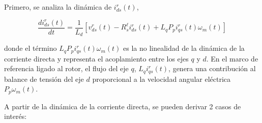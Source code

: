 \documentclass[blue,fullpaper]{ludusofficial}  %
\begin{document}
Primero, se analiza la dinámica de $i_{ds}^{r}(t)$,

\begin{equation}
\label{variacion_ids}
    \frac{di_{ds}^{r}(t)}{dt} = \frac{1}{L_{d}} \left[ v_{ds}^{r}(t) - R_{s}^{\ell} i_{ds}^{r}(t) + L_{q}P_{p} i_{qs}^{r}(t) \omega_{m}(t) \right]
\end{equation}

donde el término $L_q P_p i_{qs}^{r}(t)\omega_m(t)$ es la no linealidad de la dinámica de la corriente directa y representa el
acoplamiento entre los ejes $q$ y $d$. En el marco de referencia
ligado al rotor, el flujo del eje $q$, $L_q i_{qs}^{r}(t)$, genera
una contribución al balance de tensión del eje $d$ proporcional a
la velocidad angular eléctrica $P_p\omega_m(t)$.  

A partir de la dinámica de la corriente directa, se pueden derivar 2 casos de interés:
\end{document}
